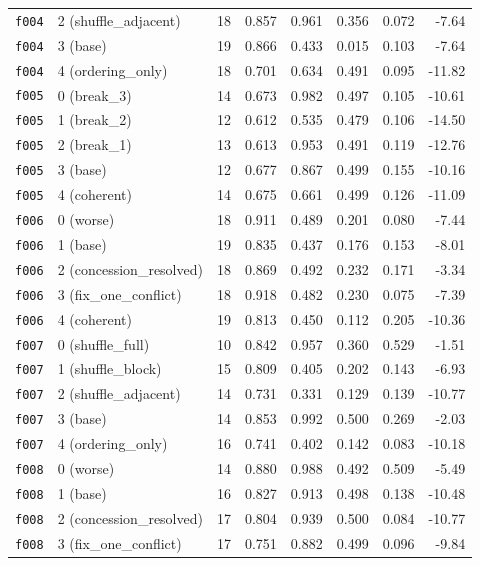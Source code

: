 \documentclass[11pt]{article}
\begin{document}
\begin{table}[htbp]
\begin{tabular}{llrrrrrr}
\texttt{f004} & 2 (shuffle\_adjacent) & 18 & 0.857 & 0.961 & 0.356 & 0.072 & -7.64 \\
\texttt{f004} & 3 (base) & 19 & 0.866 & 0.433 & 0.015 & 0.103 & -7.64 \\
\texttt{f004} & 4 (ordering\_only) & 18 & 0.701 & 0.634 & 0.491 & 0.095 & -11.82 \\
\midrule
\texttt{f005} & 0 (break\_3) & 14 & 0.673 & 0.982 & 0.497 & 0.105 & -10.61 \\
\texttt{f005} & 1 (break\_2) & 12 & 0.612 & 0.535 & 0.479 & 0.106 & -14.50 \\
\texttt{f005} & 2 (break\_1) & 13 & 0.613 & 0.953 & 0.491 & 0.119 & -12.76 \\
\texttt{f005} & 3 (base) & 12 & 0.677 & 0.867 & 0.499 & 0.155 & -10.16 \\
\texttt{f005} & 4 (coherent) & 14 & 0.675 & 0.661 & 0.499 & 0.126 & -11.09 \\
\midrule
\texttt{f006} & 0 (worse) & 18 & 0.911 & 0.489 & 0.201 & 0.080 & -7.44 \\
\texttt{f006} & 1 (base) & 19 & 0.835 & 0.437 & 0.176 & 0.153 & -8.01 \\
\texttt{f006} & 2 (concession\_resolved) & 18 & 0.869 & 0.492 & 0.232 & 0.171 & -3.34 \\
\texttt{f006} & 3 (fix\_one\_conflict) & 18 & 0.918 & 0.482 & 0.230 & 0.075 & -7.39 \\
\texttt{f006} & 4 (coherent) & 19 & 0.813 & 0.450 & 0.112 & 0.205 & -10.36 \\
\midrule
\texttt{f007} & 0 (shuffle\_full) & 10 & 0.842 & 0.957 & 0.360 & 0.529 & -1.51 \\
\texttt{f007} & 1 (shuffle\_block) & 15 & 0.809 & 0.405 & 0.202 & 0.143 & -6.93 \\
\texttt{f007} & 2 (shuffle\_adjacent) & 14 & 0.731 & 0.331 & 0.129 & 0.139 & -10.77 \\
\texttt{f007} & 3 (base) & 14 & 0.853 & 0.992 & 0.500 & 0.269 & -2.03 \\
\texttt{f007} & 4 (ordering\_only) & 16 & 0.741 & 0.402 & 0.142 & 0.083 & -10.18 \\
\midrule
\texttt{f008} & 0 (worse) & 14 & 0.880 & 0.988 & 0.492 & 0.509 & -5.49 \\
\texttt{f008} & 1 (base) & 16 & 0.827 & 0.913 & 0.498 & 0.138 & -10.48 \\
\texttt{f008} & 2 (concession\_resolved) & 17 & 0.804 & 0.939 & 0.500 & 0.084 & -10.77 \\
\texttt{f008} & 3 (fix\_one\_conflict) & 17 & 0.751 & 0.882 & 0.499 & 0.096 & -9.84 \\

\end{tabular}
\end{table}
\end{document}

